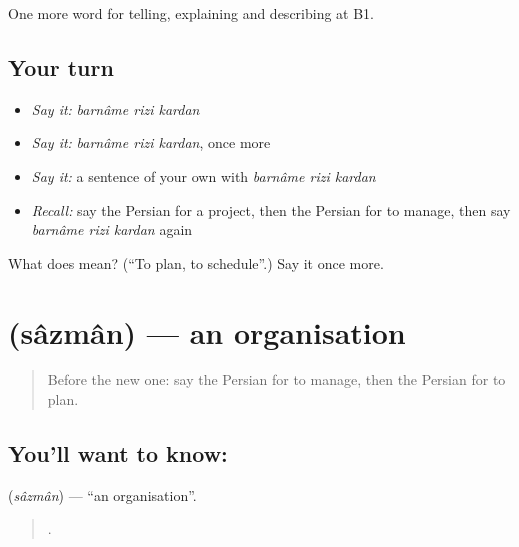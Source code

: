 \begin{grammarlens}[title={What you've built}]
One more word for telling, explaining and describing at B1.
\end{grammarlens}

\subsection*{Your turn}
\begin{itemize}
\raggedright
  \item \emph{Say it:} \emph{barnâme rizi kardan}
  \item \emph{Say it:} \emph{barnâme rizi kardan}, once more
  \item \emph{Say it:} a sentence of your own with \emph{barnâme rizi kardan}
  \item \emph{Recall:} say the Persian for a project, then the Persian for to manage, then say \emph{barnâme rizi kardan} again
\end{itemize}

\begin{tcolorbox}[breakable,colback=teal!4,colframe=teal!35!black,title={Before you move on}]
What does    mean? (\textquotedblleft{}To plan, to schedule\textquotedblright{}.) Say it once more.
\end{tcolorbox}
\section[\texorpdfstring{\fa{سازمان} (sâzmân)}{سازمان (sâzmân)}]{ (sâzmân) — an organisation}

\label{lesson:FA-C382-sazman}



\begin{quote}
Before the new one: say the Persian for to manage, then the Persian for to plan.
\end{quote}

\subsection*{You'll want to know: }
\textbf{} (\emph{sâzmân}) — \textquotedblleft{}an organisation\textquotedblright{}.

\begin{quote}
       .
\end{quote}

